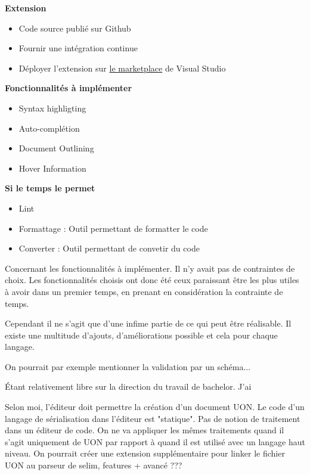 \documentclass[
    iict, %
    il, %
]{heig-tb}
\begin{document}
\textbf{Extension}
\begin{itemize}
    \item Code source publié sur Github
    \item Fournir une intégration continue
    \item Déployer l'extension sur \href{https://marketplace.visualstudio.com/}{le marketplace} de Visual Studio
\end{itemize}

\textbf{Fonctionnalités à implémenter}
\begin{itemize}
    \item Syntax highligting
    \item Auto-complétion
    \item Document Outlining
    \item Hover Information
\end{itemize}

\textbf{Si le temps le permet}
\begin{itemize}
    \item Lint
    \item Formattage : Outil permettant de formatter le code
    \item Converter : Outil permettant de convetir du code
\end{itemize}

\vspace{\parskip}

Concernant les fonctionnalités à implémenter. Il n'y avait pas de contraintes de choix.
Les fonctionnalités choisis ont donc été ceux paraissant être les plus utiles à avoir dans un premier temps, en prenant en considération la contrainte de temps.

Cependant il ne s'agit que d'une infime partie de ce qui peut être réalisable.
Il existe une multitude d'ajouts, d'améliorations possible et cela pour chaque langage.

On pourrait par exemple mentionner la validation par un schéma...

Étant relativement libre sur la direction du travail de bachelor. J'ai 

Selon moi, l'éditeur doit permettre la création d'un document UON. Le code d'un langage de sérialisation dans l'éditeur est "statique".
Pas de notion de traitement dans un éditeur de code. On ne va appliquer les mêmes traitements quand il s'agit uniquement de UON par rapport à quand il est utilisé avec un langage haut niveau.
On pourrait créer une extension supplémentaire pour linker le fichier UON au parseur de selim, features + avancé ???
\end{document}
